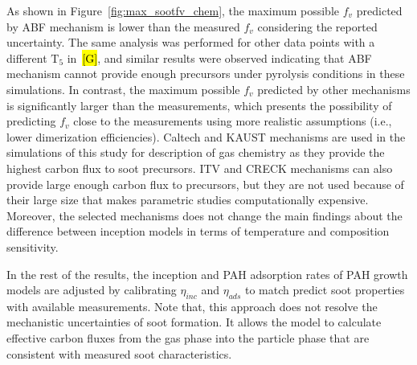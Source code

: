 As shown in Figure~\ref{fig:max_sootfv_chem}, the maximum possible $f_v$ predicted by ABF mechanism is lower than the measured $f_v$ considering the reported uncertainty. The same analysis was performed for other data points with a different $\mathrm{T_5}$ in~\hl{[G]}, and similar results were observed indicating that ABF mechanism cannot provide enough precursors under pyrolysis conditions in these simulations. In contrast, the maximum possible $f_v$ predicted by other mechanisms is significantly larger than the measurements, which presents the possibility of predicting $f_v$ close to the measurements using more realistic assumptions (i.e., lower dimerization efficiencies). Caltech and KAUST mechanisms are used in the simulations of this study for description of gas chemistry as they provide the highest carbon flux to soot precursors. ITV and CRECK mechanisms can also provide large enough carbon flux to precursors, but they are not used because of their large size that makes parametric studies computationally expensive. Moreover, the selected mechanisms does not change the main findings about the difference between inception models in terms of temperature and composition sensitivity.

In the rest of the results, the inception and PAH adsorption rates of PAH growth models are adjusted by calibrating $\eta_{inc}$ and $\eta_{ads}$ to match predict soot properties with available measurements. Note that, this approach does not resolve the mechanistic uncertainties of soot formation. It allows the model to calculate effective carbon fluxes from the gas phase into the particle phase that are consistent with measured soot characteristics.